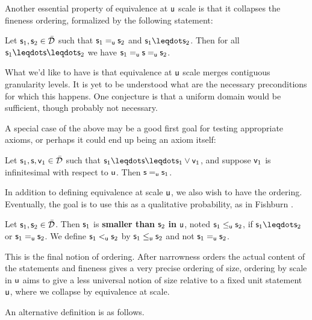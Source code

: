 \documentclass[10pt, onecolumn, longbibliography, nofootinbib]{revtex4-2}
\begin{document}
Another essential property of equivalence at $\stmt[u]$ scale is that it collapses the fineness ordering, formalized by the following statement:

\begin{desid}
	Let $\stmt_1, \stmt_2 \in \tdomain$ such that $\stmt_1 \equ \stmt_2$ and $\stmt_1 \finer \stmt_2$. Then for all $\stmt_1 \finer \stmt \finer \stmt_2$ we have $\stmt_1 \equ \stmt \equ \stmt_2$.
\end{desid}

\begin{remark}
	What we'd like to have is that equivalence at $\stmt[u]$ scale merges contiguous granularity levels. It is yet to be understood what are the necessary preconditions for which this happens. One conjecture is that a uniform domain would be sufficient, though probably not necessary.
\end{remark}

A special case of the above may be a good first goal for testing appropriate axioms, or perhaps it could end up being an axiom itself:

\begin{desid}
	Let $\stmt_1,\stmt,\stmt[v]_1\in\tdomain$ such that $\stmt_1\finer\stmt\finer\stmt_1\OR\stmt[v]_1$, and suppose $\stmt[v]_1$ is infinitesimal with respect to $\stmt[u]$. Then $\stmt\equ\stmt_1$. 
\end{desid}

In addition to defining equivalence at scale $\stmt[u]$, we also wish to have the ordering. Eventually, the goal is to use this as a qualitative probability, as in Fishburn \cite{fishburnsurvey}. 

\begin{defn}\label{smalleru}
	Let $\stmt_1, \stmt_2 \in \tdomain$. Then $\stmt_1$ is \textbf{smaller than} $\stmt_2$ \textbf{in} $\stmt[u]$, noted $\stmt_1 \lequ \stmt_2$, if $\stmt_1 \finer \stmt_2$ or $\stmt_1 \equ \stmt_2$. We define $\stmt_1\leu\stmt_2$ by $\stmt_1\lequ\stmt_2$ and not $\stmt_1\equ\stmt_2$. 
\end{defn}

This is the final notion of ordering. After narrowness orders the actual content of the statements and fineness gives a very precise ordering of size, ordering by scale in $\stmt[u]$ aims to give a less universal notion of size relative to a fixed unit statement $\stmt[u]$, where we collapse by equivalence at scale. 

An alternative definition is as follows. 
\end{document}
